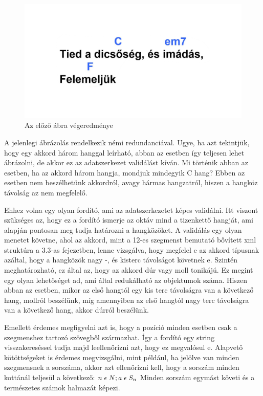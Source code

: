 \begin{figure}[h]
	\includegraphics[scale=0.25]{images/representated_sheet.png}
	\caption{Az előző ábra végeredménye}
	\label{fig:repres2}
\end{figure}


A jelenlegi ábrázolás rendelkezik némi redundanciával. Ugye, ha azt tekintjük, hogy egy akkord három hanggal leírható, abban az esetben így  teljesen lehet ábrázolni, de akkor ez az adatszerkezet validálást kíván. Mi történik abban az esetben, ha az akkord három hangja, mondjuk mindegyik C hang? Ebben az esetben nem beszélhetünk akkordról, avagy hármas hangzatról, hiszen a hangköz távolság az nem megfelelő.

Ehhez volna egy olyan fordító, ami az adatszerkezetet képes validálni. Itt viszont szükséges az, hogy ez a fordító ismerje az oktáv mind a tizenkettő hangját, ami alapján pontosan meg tudja határozni a hangközöket. A validálás egy olyan menetet követne, ahol az akkord, mint a 12-es szegmenst bemutató bővített xml struktúra a 3.3-as fejezetben, lenne vizsgálva, hogy megfelel e az akkord típusnak azáltal, hogy a hangközök nagy -, és kisterc távolságot követnek e. Szintén meghatározható, ez által az, hogy az akkord dúr vagy moll tonikájú. Ez megint egy olyan lehetőséget ad, ami által redukálható az objektumok száma. Hiszen abban az esetben, mikor az első hangtól egy kis terc távolságra van a következő hang, mollról beszélünk, míg amennyiben az első hangtól nagy terc távolságra van a következő hang, akkor dúrról beszélünk.

Emellett érdemes megfigyelni azt is, hogy a pozíció minden esetben csak a szegmenshez tartozó szövegből származhat. Így a fordító egy string visszakereséssel tudja majd leellenőrizni azt, hogy ez megvalósul e. Alapvető kötöttségeket is érdemes megvizsgálni, mint például, ha jelölve van minden szegmensnek a sorszáma, akkor azt ellenőrizni kell, hogy a sorszám minden kottánál teljesül a következő:
$	n\; \epsilon \; N; a\; \epsilon \; S_{n} \\$
Minden sorszám egymást követi és a természetes számok halmazát képezi. 
